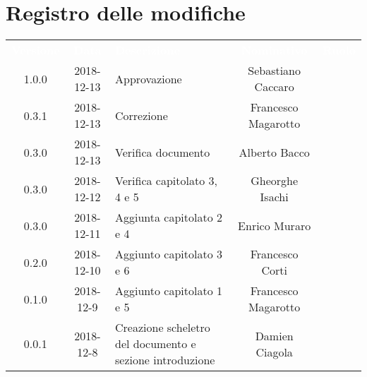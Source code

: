 
\section*{Registro delle modifiche}
{
	\renewcommand{\arraystretch}{1.5}
	\centering
	\begin{longtable}{ c c  C{4cm}  c  c }
		\textcolor{white}{\textbf{Versione}} & \textcolor{white}{\textbf{Data}} & \textcolor{white}{\textbf{Descrizione}} & \textcolor{white}{\textbf{Nominativo}} & \textcolor{white}{\textbf{Ruolo}}\\
		1.0.0 & 2018-12-13 & Approvazione & Sebastiano Caccaro & \Res{} \\		
		0.3.1 & 2018-12-13 & Correzione & Francesco Magarotto & \reda{} \\
		0.3.0 & 2018-12-13 & Verifica documento & Alberto Bacco & \ver{} \\
		0.3.0 & 2018-12-12 & Verifica capitolato 3, 4 e 5 & Gheorghe Isachi & \ver{}\\
		0.3.0 & 2018-12-11 & Aggiunta capitolato 2 e 4 & Enrico Muraro & \reda{}\\
		0.2.0 & 2018-12-10 & Aggiunto capitolato 3 e 6 & Francesco Corti & \reda{}\\
		0.1.0 & 2018-12-9 & Aggiunto capitolato 1 e 5 & Francesco Magarotto & \reda{} \\
		0.0.1 & 2018-12-8 & Creazione scheletro del documento e sezione introduzione & Damien Ciagola & \reda{}\\
	\end{longtable}

}